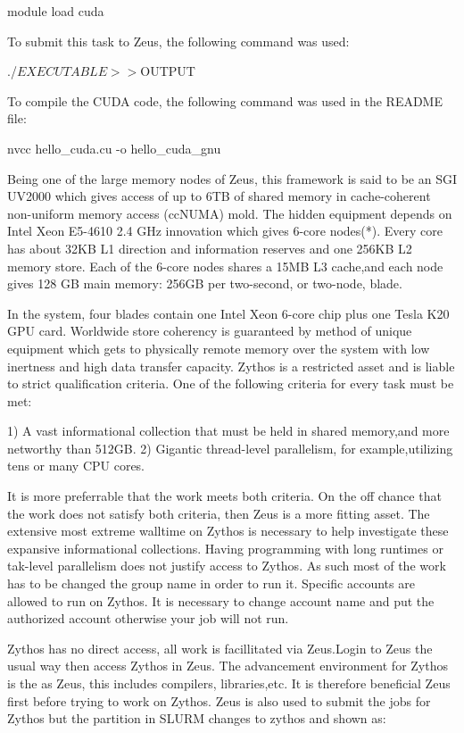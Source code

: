 \begin{Document}
module load cuda

To submit this task to Zeus, the following command was used:

./$EXECUTABLE >> ${OUTPUT}

To compile the CUDA code, the following command was used in the README file:

nvcc hello_cuda.cu -o hello_cuda_gnu
 
  

Being one of the large memory nodes of Zeus, this framework is said to be an SGI UV2000 which gives access of up to 6TB of shared memory in cache-coherent non-uniform memory access (ccNUMA) mold.
The hidden equipment depends on Intel Xeon E5-4610 2.4 GHz innovation which gives 6-core nodes(*). 
Every core has about 32KB L1 direction and information reserves and one 256KB L2 memory store. 
Each of the 6-core nodes shares a 15MB L3 cache,and each node gives 128 GB main memory: 256GB per two-second, or two-node, blade.

In the system, four blades contain one Intel Xeon 6-core chip plus one Tesla K20 GPU card.
Worldwide store coherency is guaranteed by method of unique equipment which gets to physically remote memory over the system with low inertness and high data transfer capacity.
Zythos is a restricted asset and is liable to strict qualification criteria. 
One of the following criteria for every task must be met:

1) A vast informational collection that must be held in shared memory,and more networthy than 512GB.
2) Gigantic thread-level parallelism, for example,utilizing tens or many CPU cores.

It is more preferrable that the work meets both criteria. 
On the off chance that the work does not satisfy both criteria, then Zeus is a more fitting asset.
The extensive most extreme walltime on Zythos is necessary to help investigate these expansive informational collections.
Having programming with long runtimes or tak-level parallelism does not justify access to Zythos.
As such most of the work has to be changed the group name in order to run it. 
Specific accounts are allowed to run on Zythos. It is necessary to change account name and put the authorized account otherwise your job will not run.

Zythos has no direct access, all work is facillitated via Zeus.Login to Zeus the usual way then access Zythos in Zeus.
The advancement environment for Zythos is the as Zeus, this includes compilers, libraries,etc. 
It is therefore beneficial Zeus first before trying to work on Zythos.
Zeus is also used to submit the jobs for Zythos but the partition in SLURM changes to zythos and shown as:


\end{Document}
